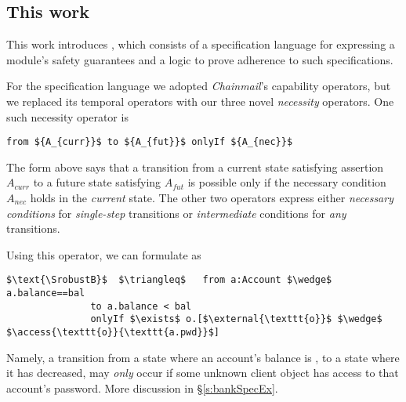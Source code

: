 {
  
\vspace{.04in}

\subsection{This work}
This work introduces \Nec, which consists of a specification language for expressing a module's safety guarantees 
and a logic 
to prove adherence to such specifications.

For the specification language we adopted %
\emph{Chainmail}'s %
  capability operators, 
but we replaced its temporal operators with  {our three novel}
  \emph{necessity} operators. 
 One such necessity operator is
 
 \begin{lstlisting}[mathescape=true, language=chainmail, frame=lines]
                                from ${A_{curr}}$ to ${A_{fut}}$ onlyIf ${A_{nec}}$ 
\end{lstlisting}
The  form   {above} says that %
a  {transition} from a current state satisfying assertion $A_{curr}$ to a future
state satisfying $A_{fut}$ %
is possible only if the   necessary 
condition
$A_{nec}$ holds in the \emph{current} state.
The other two operators express either \emph{necessary conditions} for
\emph{single-step} transitions %
or \emph{intermediate} conditions for \emph{any} transitions.
}
Using this operator, we can formulate  \SrobustB %
as
\begin{lstlisting}[language = Chainmail, mathescape=true, frame=lines]
$\text{\SrobustB}$  $\triangleq$   from a:Account $\wedge$ a.balance==bal
               to a.balance < bal
               onlyIf $\exists$ o.[$\external{\texttt{o}}$ $\wedge$ $\access{\texttt{o}}{\texttt{a.pwd}}$]
\end{lstlisting}
Namely, a transition from a  state where an account's balance is , to a  state where 
it has decreased, may \emph{only} occur if  some unknown client object  has access to that account's password. 
More discussion in \S\ref{s:bankSpecEx}. 

